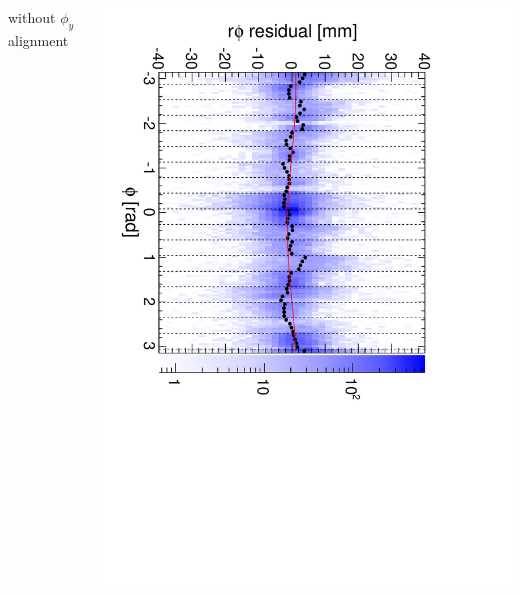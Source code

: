 \documentclass[compress]{beamer}
\begin{document}
\begin{frame}
\begin{columns}
\centering without $\phi_y$ alignment

\includegraphics[height=\linewidth, angle=90]{diskiter02_phiyzero_m2to3.pdf}
\end{columns}
\end{frame}
\end{document}
